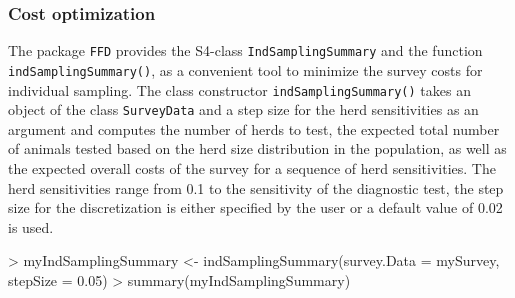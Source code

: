 \documentclass[nojss]{jss}
\begin{document}
\subsubsection{Cost optimization}

The package \texttt{FFD} provides the S4-class
\texttt{IndSamplingSummary}
 and the function
\texttt{indSamplingSummary()}, 
as a convenient tool to minimize the survey costs for individual
sampling. The class constructor \texttt{indSamplingSummary()} takes
an object of the class \texttt{SurveyData} and a step size for the
herd sensitivities as an argument and computes the number of herds
to test, the expected total number of animals tested based on the
herd size distribution in the population, as well as the expected
overall costs of the survey for a sequence of herd sensitivities. The
herd sensitivities range from 0.1 to the sensitivity of the
diagnostic test, the step size for the discretization is either
specified by the user or a default value of 0.02 is used.

\begin{Schunk}
\begin{Sinput}
> myIndSamplingSummary <- indSamplingSummary(survey.Data = mySurvey, 
       stepSize = 0.05)
> summary(myIndSamplingSummary)
\end{Sinput}
\end{Schunk}
\end{document}
